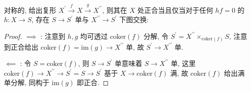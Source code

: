 \begin{lemma}
    \label {lemma:universal property of exactness symmetric}
    对称的, 给出复形 \(X^\prime \xrightarrow{f} X \xrightarrow{g} X^{\prime\prime}\), 则其在 \(X\) 处正合当且仅当对于任何 \(h f = 0\) 的 \(h : X \to S\),
    存在 \(S \to S^\prime\) 单与 \(X^{\prime\prime} \to S^\prime\) 下图交换:

    \begin{center}
    \end{center}

    \begin{proof}
        \(\implies\) : 注意到 \(h,g\) 均可透过 \(\mathrm{coker} (f)\) 分解, 令 \(S^\prime = X^{\prime\prime} \times_{\mathrm{coker} (f)} S\),
        注意到正合给出 \(\mathrm{coker} (f) = \mathrm{im} (g) \to X^{\prime\prime}\) 单, 故 \(S^\prime \to X^{\prime\prime}\) 单.

        \(\impliedby\) : 令 \(S = \mathrm{coker} (f)\), 则 \(S \to S^\prime\) 单意味着 \(S \to X^{\prime\prime}\) 单, 这里 \(\mathrm{coker} (f) \to X^{\prime\prime} \to S^\prime = S \to S^\prime\) 基于 \(X \to \mathrm{coker} (f)\) 满, 故 \(\mathrm{coker} (f)\) 给出满单分解, 同构于 \(\mathrm{im} (g)\) 即正合.
    \end{proof}
\end{lemma}


